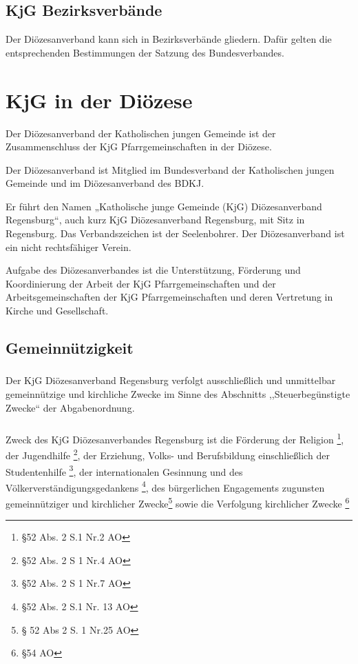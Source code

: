 \documentclass[12pt]{report}
\begin{document}
\begin{flushleft}
\section{KjG Bezirksverbände}
Der Diözesanverband kann sich in Bezirksverbände gliedern. Dafür gelten die entsprechenden
Bestimmungen der Satzung des Bundesverbandes.
\chapter{KjG in der Diözese}
Der Diözesanverband der Katholischen jungen Gemeinde ist der Zusammenschluss der
KjG Pfarrgemeinschaften in der Diözese.

Der Diözesanverband ist Mitglied im Bundesverband der Katholischen jungen Gemeinde und im
Diözesanverband des BDKJ.

Er führt den Namen „Katholische junge Gemeinde (KjG) Diözesanverband Regensburg“,
auch kurz KjG Diözesanverband Regensburg, mit Sitz in Regensburg.
Das Verbandszeichen ist der Seelenbohrer.
Der Diözesanverband ist ein nicht rechtsfähiger Verein.

Aufgabe des Diözesanverbandes ist die Unterstützung, Förderung und Koordinierung der Arbeit
der KjG Pfarrgemeinschaften und der Arbeitsgemeinschaften der KjG Pfarrgemeinschaften und
deren Vertretung in Kirche und Gesellschaft.

\section{Gemeinnützigkeit}

\subsection{}
Der KjG Diözesanverband Regensburg verfolgt ausschließlich und unmittelbar gemeinnützige
und kirchliche Zwecke im Sinne des Abschnitts ,,Steuerbegünstigte Zwecke`` der Abgabenordnung.

\subsection{}
\label{sec:Zweck}
Zweck des KjG Diözesanverbandes Regensburg ist die
Förderung der Religion \footnote{§52 Abs. 2 S.1 Nr.2 AO},
der Jugendhilfe \footnote{§52 Abs. 2 S 1 Nr.4 AO},
der Erziehung, Volks- und Berufsbildung einschließlich
der Studentenhilfe \footnote{§52 Abs. 2 S 1 Nr.7 AO}, der internationalen Gesinnung und des
Völkerverständigungsgedankens \footnote{§52 Abs. 2 S.1 Nr. 13 AO}, des bürgerlichen Engagements zugunsten
gemeinnütziger und kirchlicher Zwecke\footnote{§ 52 Abs 2 S. 1 Nr.25 AO}
sowie die Verfolgung kirchlicher Zwecke \footnote{§54 AO}


\end{flushleft}
\end{document}
